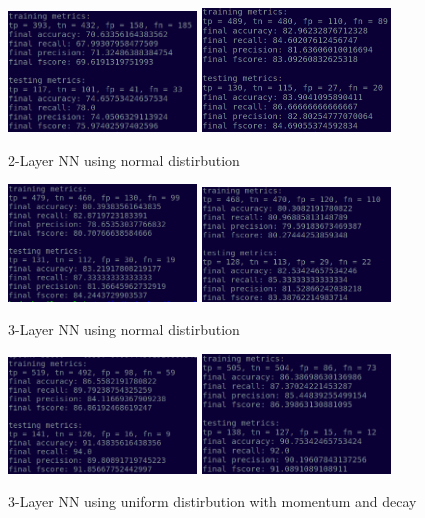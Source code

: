 \documentclass[a4paper,10pt,twocolumn]{article}
\begin{document}
\begin{figure}[h!]
\centering
\includegraphics[scale=1.0, width=5cm]{Fig5.png}
\includegraphics[scale=1.0, width=5cm]{Fig6.png}
\caption*{2-Layer NN using normal distirbution}
\end{figure}

\begin{figure}[h!]
\centering
\includegraphics[scale=1.0, width=5cm]{Fig7.png}
\includegraphics[scale=1.0, width=5cm]{Fig8.png}
\caption*{3-Layer NN using normal distirbution}
\end{figure}

\begin{figure}[h!]
\centering
\includegraphics[scale=1.0, width=5cm]{Fig9.png}
\includegraphics[scale=1.0, width=5cm]{Fig10.png}
\caption*{3-Layer NN using uniform distirbution with momentum and decay}
\end{figure}
\end{document}
